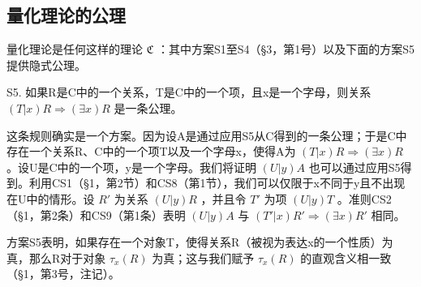 \subsection{量化理论的公理}

量化理论是任何这样的理论 \(\mathfrak{C}\) ：其中方案S1至S4（§3，第1号）以及下面的方案S5提供隐式公理。

S5. 如果R是C中的一个关系，T是C中的一个项，且x是一个字母，则关系 \((T|x)R \Longrightarrow (\exists x)R\) 是一条公理。

这条规则确实是一个方案。因为设A是通过应用S5从C得到的一条公理；于是C中存在一个关系R、C中的一个项T以及一个字母x，使得A为 \((T|x)R \Longrightarrow (\exists x)R\) 。设U是C中的一个项，y是一个字母。我们将证明 \((U|y)A\) 也可以通过应用S5得到。利用CS1（§1，第2节）和CS8（第1节），我们可以仅限于x不同于y且不出现在U中的情形。设 \(R'\) 为关系 \((U|y)R\) ，并且令 \(T'\) 为项 \((U|y)T\) 。准则CS2（§1，第2条）和CS9（第1条）表明 \((U|y)A\) 与 \((T'|x)R' \Longrightarrow (\exists x)R'\) 相同。

方案S5表明，如果存在一个对象T，使得关系R（被视为表达x的一个性质）为真，那么R对于对象 \(\tau_{x}(R)\) 为真；这与我们赋予 \(\tau_{x}(R)\) 的直观含义相一致（§1，第3号，注记）。

